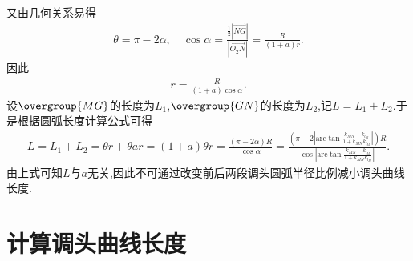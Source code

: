 \documentclass[lang=cn,newtx,10pt,scheme=chinese]{../Template/elegantbook}
\begin{document}
又由几何关系易得
\begin{align}
\theta =\pi -2\alpha ,\quad \cos \alpha =\frac{\frac{1}{2}\left| \overrightarrow{NG} \right|}{\left| \overrightarrow{O_2N} \right|}=\frac{R}{\left( 1+a \right) r}.
\end{align}
因此
\begin{align}
r=\frac{R}{\left( 1+a \right) \cos \alpha}.
\end{align}
设$\overgroup{MG}$的长度为$L_1$,$\overgroup{GN}$的长度为$L_2$,记$L=L_1+L_2$.于是根据圆弧长度计算公式可得
\begin{align}\label{equation-1}
L=L_1+L_2=\theta r+\theta ar=\left( 1+a \right) \theta r=\frac{\left( \pi -2\alpha \right) R}{\cos \alpha}=\frac{\left( \pi -2\left| \mathrm{arc}\tan \frac{k_{MN}-k_{l_M}}{1+k_{MN}k_{l_M}} \right| \right) R}{\cos \left| \mathrm{arc}\tan \frac{k_{MN}-k_{l_M}}{1+k_{MN}k_{l_M}} \right|}.
\end{align}
由上式可知$L$与$a$无关,因此不可通过改变前后两段调头圆弧半径比例减小调头曲线长度.


\section{计算调头曲线长度}
\end{document}
